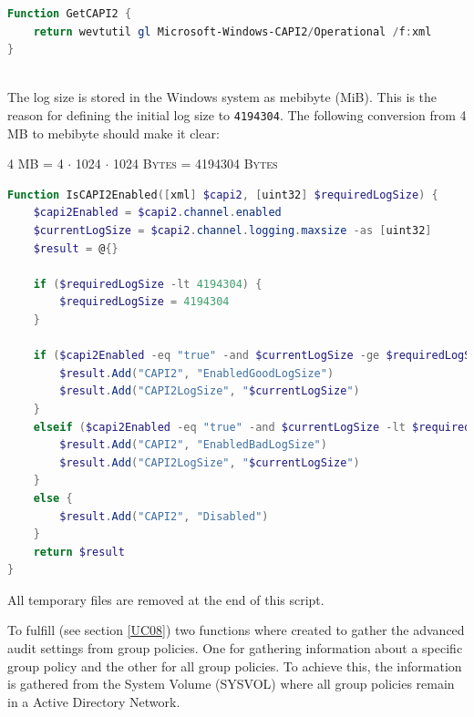 \begin{lstlisting}[caption=Function GetCAPI2, language=PowerShell]
Function GetCAPI2 {
    return wevtutil gl Microsoft-Windows-CAPI2/Operational /f:xml
}
\end{lstlisting}\ \\
The log size is stored in the Windows system as mebibyte (MiB). This is the reason for defining the initial log size to \lstinline|4194304|. The following conversion from 4 MB to mebibyte should make it clear:
\begin{center}
    \textsc{4 MB = 4 $\cdot$ 1024 $\cdot$ 1024 Bytes = 4194304 Bytes }
\end{center}
\begin{lstlisting}[caption=Function IsCAPI2Enabled, language=PowerShell]
Function IsCAPI2Enabled([xml] $capi2, [uint32] $requiredLogSize) {
    $capi2Enabled = $capi2.channel.enabled
    $currentLogSize = $capi2.channel.logging.maxsize -as [uint32]
    $result = @{}

    if ($requiredLogSize -lt 4194304) {
        $requiredLogSize = 4194304
    }

    if ($capi2Enabled -eq "true" -and $currentLogSize -ge $requiredLogSize) {
        $result.Add("CAPI2", "EnabledGoodLogSize")
        $result.Add("CAPI2LogSize", "$currentLogSize")
    }
    elseif ($capi2Enabled -eq "true" -and $currentLogSize -lt $requiredLogSize) {
        $result.Add("CAPI2", "EnabledBadLogSize")
        $result.Add("CAPI2LogSize", "$currentLogSize")
    }
    else {
        $result.Add("CAPI2", "Disabled")
    }
    return $result
}  
\end{lstlisting}
All temporary files are removed at the end of this script.
\clearpage

To fulfill  (see section \ref{UC08}) two functions where created to gather the advanced audit settings from group policies. One for gathering information about a specific group policy and the other for all group policies. To achieve this, the information is gathered from the System Volume (SYSVOL) where all group policies remain in a Active Directory Network. 

